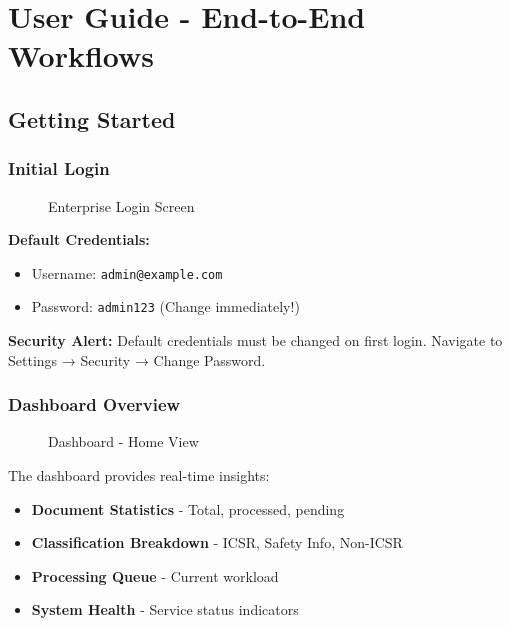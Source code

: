 
\chapter{User Guide - End-to-End Workflows}

\section{Getting Started}

\subsection{Initial Login}

\begin{figure}[h]
\centering
{}
\caption{Enterprise Login Screen}
\label{fig:login}
\end{figure}

\textbf{Default Credentials:}
\begin{itemize}
    \item Username: \texttt{admin@example.com}
    \item Password: \texttt{admin123} (Change immediately!)
\end{itemize}

\begin{warningbox}
\textbf{Security Alert:} Default credentials must be changed on first login. Navigate to Settings → Security → Change Password.
\end{warningbox}

\subsection{Dashboard Overview}

\begin{figure}[h]
\centering
{}
\caption{Dashboard - Home View}
\label{fig:dashboard}
\end{figure}

The dashboard provides real-time insights:
\begin{itemize}
    \item \textbf{Document Statistics} - Total, processed, pending
    \item \textbf{Classification Breakdown} - ICSR, Safety Info, Non-ICSR
    \item \textbf{Processing Queue} - Current workload
    \item \textbf{System Health} - Service status indicators
\end{itemize}

